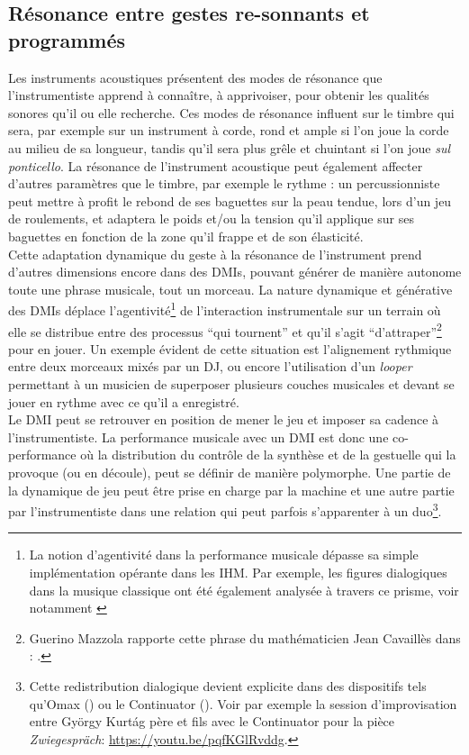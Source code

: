 \subsection{Résonance entre gestes re-sonnants et programmés}

\noindent Les instruments acoustiques présentent des modes de résonance que l'instrumentiste apprend à connaître, à apprivoiser, pour obtenir les qualités sonores qu'il ou elle recherche. Ces modes de résonance influent sur le timbre qui sera, par exemple sur un instrument à corde, rond et ample si l'on joue la corde au milieu de sa longueur, tandis qu'il sera plus grêle et chuintant si l'on joue \textit{sul ponticello}. La résonance de l'instrument acoustique peut également affecter d'autres paramètres que le timbre, par exemple le rythme : un percussionniste peut mettre à profit le rebond de ses baguettes sur la peau tendue, lors d'un jeu de roulements, et adaptera le poids et/ou la tension qu'il applique sur ses baguettes en fonction de la zone qu'il frappe et de son élasticité.\\
\indent Cette adaptation dynamique du geste à la résonance de l'instrument prend d'autres dimensions encore dans des \glspl{DMI}, pouvant générer de manière autonome toute une phrase musicale, tout un morceau. La nature dynamique et générative des \glspl{DMI} déplace l'agentivité\footnote{La notion d'agentivité dans la performance musicale dépasse sa simple implémentation opérante dans les \gls{IHM}. Par exemple, les figures dialogiques dans la musique classique ont été également analysée à travers ce prisme, voir notamment \cite{graybill_whose_2016}} de l'interaction instrumentale sur un terrain où elle se distribue entre des processus ``qui tournent'' et qu'il s'agit ``d'attraper''\footnote{Guerino Mazzola rapporte cette phrase du mathématicien Jean Cavaillès dans \cite{mazzola_topos_2018}: .} pour en jouer. Un exemple évident de cette situation est l'alignement rythmique entre deux morceaux mixés par un \gls{DJ}, ou encore l'utilisation d'un \textit{looper} permettant à un musicien de superposer plusieurs couches musicales et devant se jouer en rythme avec ce qu'il a enregistré.\\
\indent Le \gls{DMI} peut se retrouver en position de mener le jeu et imposer sa cadence à l'instrumentiste. La performance musicale avec un \gls{DMI} est donc une co-performance où la distribution du contrôle de la synthèse et de la gestuelle qui la provoque (ou en découle), peut se définir de manière polymorphe. Une partie de la dynamique de jeu peut être prise en charge par la machine et une autre partie par l'instrumentiste dans une relation qui peut parfois s'apparenter à un duo\footnote{Cette redistribution dialogique devient explicite dans des dispositifs tels qu'Omax (\cite{assayag_omax_2006}) ou le Continuator (\cite{pachet_continuator:_2003}). Voir par exemple la session d'improvisation entre György Kurtág père et fils avec le Continuator pour la pièce \textit{Zwiegespräch}: \url{https://youtu.be/pqfKGlRvddg}. }.\\
